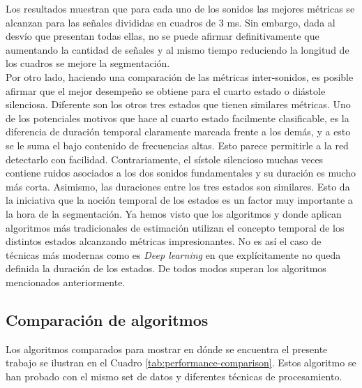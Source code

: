 \indent Los resultados muestran que para cada uno de los sonidos las mejores métricas se alcanzan para las señales
divididas en cuadros de 3 ms. Sin embargo, dada al desvío que presentan todas ellas, no se puede afirmar
definitivamente que aumentando la cantidad de señales y al mismo tiempo reduciendo la longitud de los cuadros se
mejore la segmentación. \\
\indent Por otro lado, haciendo una comparación de las métricas inter-sonidos, es posible afirmar que el mejor
desempeño se obtiene para el cuarto estado o diástole silenciosa. Diferente son los otros tres estados que tienen
similares métricas. Uno de los potenciales motivos que hace al cuarto estado facilmente clasificable, es la
diferencia de duración temporal claramente marcada frente a los demás, y a esto se le suma el bajo contenido de
frecuencias altas. Esto parece permitirle a la red detectarlo con facilidad. Contrariamente, el sístole silencioso
muchas veces contiene ruidos asociados a los dos sonidos fundamentales y su duración es mucho más corta. Asimismo,
las duraciones entre los tres estados son similares. Esto da la iniciativa que la noción temporal de los estados es
un factor muy importante a la hora de la segmentación. Ya hemos visto que los algoritmos \cite{pp:schmidt2010} y
\cite{pp:springer2015} donde aplican algoritmos más tradicionales de estimación utilizan el concepto temporal de los
distintos estados alcanzando métricas impresionantes. No es así el caso de técnicas más modernas como es
\textit{Deep learning} en \cite{pp:renna2018} que explícitamente no queda definida la duración de los estados. De
todos modos superan los algoritmos mencionados anteriormente.

\subsection*{Comparación de algoritmos}

\indent Los algoritmos comparados para mostrar en dónde se encuentra el presente trabajo se ilustran en el Cuadro
\ref{tab:performance-comparison}. Estos algoritmo se han probado con el mismo set de datos y diferentes técnicas de
procesamiento.

